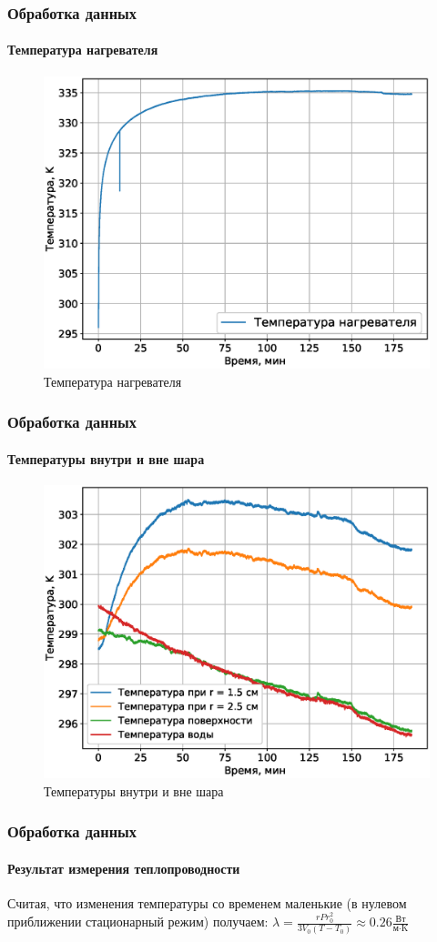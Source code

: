 \documentclass[8pt,pdf,hyperref={unicode}]{beamer}
\begin{document}
	\begin{frame}
		\frametitle{Обработка данных}
		\framesubtitle{Температура нагревателя}
		\begin{center}
			\begin{figure}[h!]
				\centering
				\includegraphics[width=0.7\linewidth]{1.eps}
				\caption{Температура нагревателя}
				\label{fig6}
			\end{figure}
		\end{center}
	\end{frame}
	\begin{frame}
		\frametitle{Обработка данных}
		\framesubtitle{Температуры внутри и вне шара}
		\begin{center}
			\begin{figure}[h!]
				\centering
				\includegraphics[width=0.7\linewidth]{2.eps}
				\caption{Температуры внутри и вне шара}
				\label{fig7}
			\end{figure}
		\end{center}
	\end{frame}
	\begin{frame}
		\frametitle{Обработка данных}
		\framesubtitle{Результат измерения теплопроводности}
		\begin{center}
		Считая, что изменения температуры со временем маленькие (в нулевом приближении стационарный режим) получаем:
			$\lambda = \frac{r P r_0^2}{3 V_0 (T - T_0)} \approx 0.26 \frac{\text{Вт}}{\text{м} \cdot \text{K}}$
		\end{center}
	\end{frame}
\end{document}
